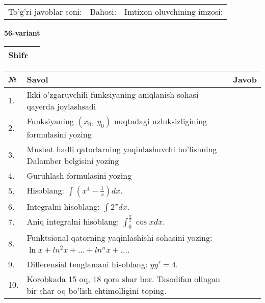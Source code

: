 \documentclass{article}
\begin{document}
  \vspace{1cm}
  
  \begin{tabular}{lll}
  To'g'ri javoblar soni: \underline{\hspace{1.5cm}} & 
  Bahosi: \underline{\hspace{1.5cm}} & 
  Imtixon oluvchining imzosi: \underline{\hspace{2cm}} \\
  \end{tabular}
  
  \egroup
  
  \newpage
  
  
  \textbf{56-variant}\\
  
  \bgroup
  \def\arraystretch{1.6} %
  
  \begin{tabular}{|m{5.7cm}|m{9.5cm}|}
  \hline
  Shifr & \\
  \hline
  \end{tabular}
  
  \vspace{1cm}
  
  \begin{tabular}{|m{0.7cm}|m{10cm}|m{4cm}|}
  \hline
  № & Savol & Javob \\
  \hline
  1. & Ikki o'zgaruvchili funksiyaning aniqlanish sohasi qayerda joylashsadi &  \\
  \hline
  2. & Funksiyaning \((x_{0},\ y_{0})\) nuqtadagi uzluksizligining formulasini yozing &  \\
  \hline
  3. & Musbat hadli qatorlarning yaqinlashuvchi bo'lishning Dalamber belgisini yozing &  \\
  \hline
  4. & Guruhlash formulasini yozing &  \\
  \hline
  5. & Hisoblang: \(\int \left( x^{4} - \frac{1}{x} \right)dx\). &  \\
  \hline
  6. & Integralni hisoblang: \(\int {2^{x}dx}\). &  \\
  \hline
  7. & Aniq integralni hisoblang: \(\int_{0}^{\frac{\pi}{2}}{\cos xdx}\). &  \\
  \hline
  8. & Funktsional qatorning yaqinlashishi sohasini yozing: \(\ln x + ln^{2}x + ... + ln^{n}x + ...\). &  \\
  \hline
  9. & Differensial tenglamani hisoblang: \(yy' = 4\). &  \\
  \hline
  10. & Korobkada 15 oq, 18 qora shar bor. Tasodifan olingan bir shar oq bo'lish ehtimolligini toping. &  \\
  \hline
  \end{tabular}
  
\end{document}
